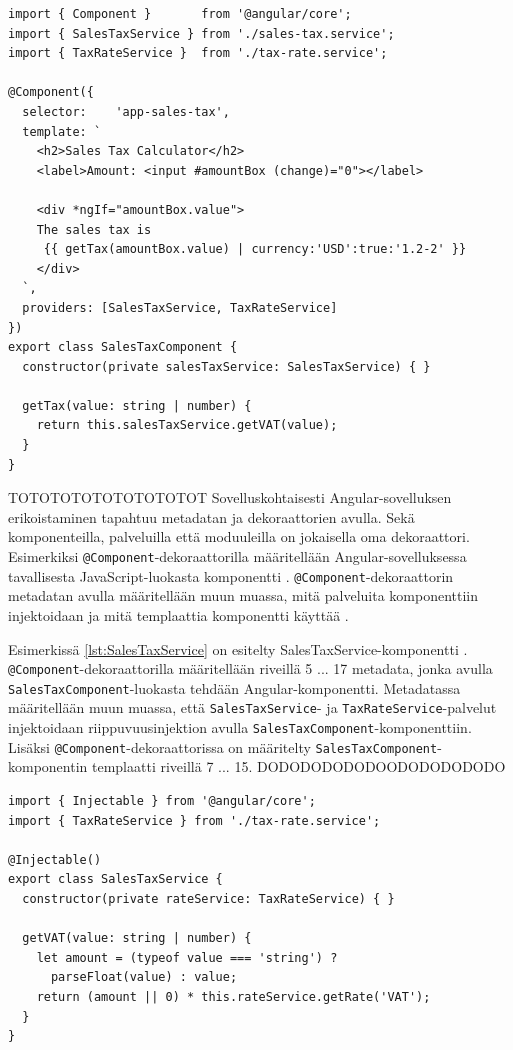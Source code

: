 \documentclass[finnish]{tktltiki2}
\theoremstyle{definition}
\theoremstyle{remark}
\numberwithin{figure}{section}
\begin{document}
\begin{lstlisting}[style=htmlcssjs, caption=SalesTaxComponent-komponentti \protect\cite{ExampleApplication}, label=lst:SalesTaxComponent ]
import { Component }       from '@angular/core';
import { SalesTaxService } from './sales-tax.service';
import { TaxRateService }  from './tax-rate.service';

@Component({
  selector:    'app-sales-tax',
  template: `
    <h2>Sales Tax Calculator</h2>
    <label>Amount: <input #amountBox (change)="0"></label>

    <div *ngIf="amountBox.value">
    The sales tax is
     {{ getTax(amountBox.value) | currency:'USD':true:'1.2-2' }}
    </div>
  `,
  providers: [SalesTaxService, TaxRateService]
})
export class SalesTaxComponent {
  constructor(private salesTaxService: SalesTaxService) { }

  getTax(value: string | number) {
    return this.salesTaxService.getVAT(value);
  }
}
\end{lstlisting}

TOTOTOTOTOTOTOTOTOT
Sovelluskohtaisesti Angular-sovelluksen erikoistaminen tapahtuu metadatan ja dekoraattorien avulla. Sekä komponenteilla, palveluilla että moduuleilla on jokaisella oma dekoraattori. Esimerkiksi \texttt{@Component}-dekoraattorilla määritellään Angular-sovelluksessa tavallisesta JavaScript-luokasta komponentti \cite{ArchitectureComponents}. \texttt{@Component}-dekoraattorin metadatan avulla määritellään muun muassa, mitä palveluita komponenttiin injektoidaan ja mitä templaattia komponentti käyttää \cite{ArchitectureComponents}. 

Esimerkissä \ref{lst:SalesTaxService} on esitelty SalesTaxService-komponentti \cite{ExampleApplication}. \texttt{@Component}-dekoraattorilla määritellään riveillä 5 ... 17 metadata, jonka avulla \texttt{SalesTaxComponent}-luokasta tehdään Angular-komponentti. Metadatassa määritellään muun muassa, että \texttt{SalesTaxService}- ja \texttt{TaxRateService}-palvelut injektoidaan riippuvuusinjektion avulla \texttt{SalesTaxComponent}-komponenttiin. Lisäksi \texttt{@Component}-dekoraattorissa on määritelty \texttt{SalesTaxComponent}-komponentin templaatti riveillä 7 ... 15. 
DODODODODODOODODODODODO

\begin{lstlisting}[style=htmlcssjs, caption=SalesTaxService-palvelu \protect\cite{ExampleApplication}, label=lst:SalesTaxService ]
import { Injectable } from '@angular/core';
import { TaxRateService } from './tax-rate.service';

@Injectable()
export class SalesTaxService {
  constructor(private rateService: TaxRateService) { }

  getVAT(value: string | number) {
    let amount = (typeof value === 'string') ?
      parseFloat(value) : value;
    return (amount || 0) * this.rateService.getRate('VAT');
  }
}
\end{lstlisting}
\end{document}
